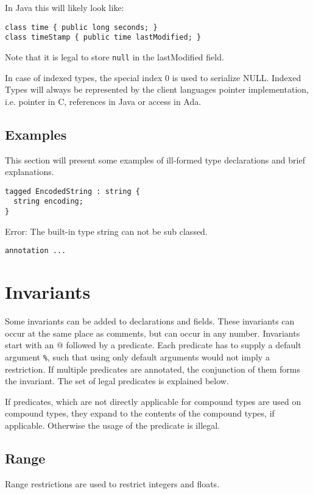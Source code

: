 \documentclass[a4paper,10pt]{article}
\begin{document}
In Java this will likely look like:
\begin{verbatim}
class time { public long seconds; }
class timeStamp { public time lastModified; }
\end{verbatim}
Note that it is legal to store \texttt{null} in the lastModified field.

In case of indexed types, the special index 0 is used to serialize NULL. Indexed Types will always be represented by the client languages pointer implementation, i.e. pointer in C, references in Java or access in Ada.


\subsection{Examples}

This section will present some examples of ill-formed type declarations and brief explanations.

\begin{verbatim}
tagged EncodedString : string {
  string encoding;
}
\end{verbatim}
Error: The built-in type string can not be sub classed.

\begin{verbatim}
annotation ...
\end{verbatim}


\section{Invariants}
Some invariants can be added to declarations and fields. These invariants can occur at the same place as comments, but can occur in any number. Invariants start with an \textsc{@} followed by a predicate. Each predicate has to supply a default argument \texttt{\%}, such that using only default arguments would not imply a restriction.
If multiple predicates are annotated, the conjunction of them forms the invariant.
The set of legal predicates is explained below.

If predicates, which are not directly applicable for compound types are used on compound types, they expand to the contents of the compound types, if applicable. Otherwise the usage of the predicate is illegal.

\subsection*{Range}
Range restrictions are used to restrict integers and floats.
\end{document}
